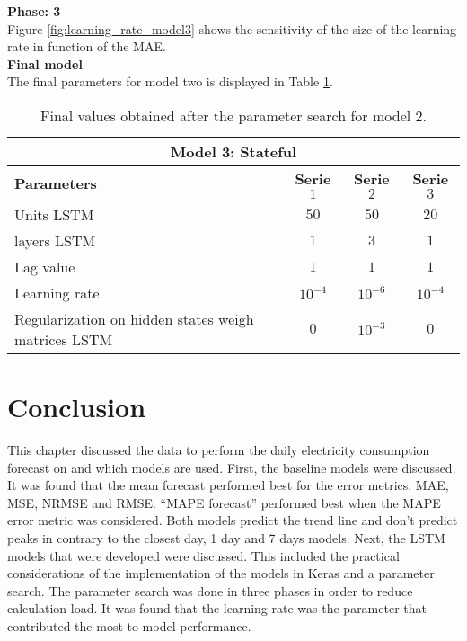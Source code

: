 \textbf{Phase: 3}\\
Figure \ref{fig:learning_rate_model3} shows the sensitivity of the size of the learning rate in function of the MAE.\\

\textbf{Final model}\\
The final parameters for model two is displayed in Table \ref{tab:final_model3}.

\begin{table}[h]
	\centering
	\begin{tabular}{@{}l|ccc@{}} \toprule
		\multicolumn{4}{c}{Model 3: Stateful}\\\midrule\midrule
		\textbf{Parameters}	& \textbf{Serie $ 1 $} & \textbf{Serie $ 2 $} & \textbf{Serie $ 3 $}\\\midrule
		Units LSTM & $50 $&$ 50 $  & $20 $\\
		layers LSTM & $1 $&$ 3 $  & $1$\\
		Lag value & $1 $&$ 1$  & $1$\\
		Learning rate & $10^{-4} $&$10^{-6} $  & $10^{-4} $\\\hline
		Regularization on hidden states weigh matrices LSTM  & $ 0 $ & $ 10^{-3} $ & $ 0 $\\\bottomrule
	\end{tabular}
	\caption{Final values obtained after the parameter search for model 2.}
	\label{tab:final_model3}
\end{table}




\section{Conclusion}
This chapter discussed the data to perform the daily electricity consumption forecast on and which models are used. First, the baseline models were discussed. It was found that the mean forecast performed best for the error metrics: MAE, MSE, NRMSE and RMSE. ``MAPE forecast'' performed best when the MAPE error metric was considered. Both models predict the trend line and don't predict peaks in contrary to the closest day, 1 day and 7 days models. Next, the LSTM models that were developed were discussed. This included the practical considerations of the implementation of the models in Keras and a parameter search. The parameter search was done in three phases in order to reduce calculation load. It was found that the learning rate was the parameter that contributed the most to model performance.


